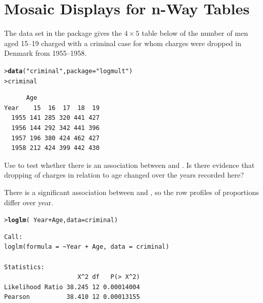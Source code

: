\documentclass[10pt]{report}\usepackage[]{graphicx}\usepackage[]{color}
\makeatletter
\newcommand{\hlstr}[1]{\textcolor[rgb]{0.192,0.494,0.8}{#1}}%
\newcommand{\hlopt}[1]{\textcolor[rgb]{0,0,0}{#1}}%
\newcommand{\hlstd}[1]{\textcolor[rgb]{0.345,0.345,0.345}{#1}}%
\newcommand{\hlkwc}[1]{\textcolor[rgb]{0.333,0.667,0.333}{#1}}%
\newcommand{\hlkwd}[1]{\textcolor[rgb]{0.737,0.353,0.396}{\textbf{#1}}}%
\newenvironment{kframe}{%
 \def\at@end@of@kframe{}%
 \ifinner\ifhmode%
  \def\at@end@of@kframe{\end{minipage}}%
  \begin{minipage}{\columnwidth}%
 \fi\fi%
 \def\FrameCommand##1{\hskip\@totalleftmargin \hskip-\fboxsep
 \colorbox{shadecolor}{##1}\hskip-\fboxsep
     \hskip-\linewidth \hskip-\@totalleftmargin \hskip\columnwidth}%
 \MakeFramed {\advance\hsize-\width
   \@totalleftmargin\z@ \linewidth\hsize
   \@setminipage}}%
 {\par\unskip\endMakeFramed%
 \at@end@of@kframe}
\newenvironment{knitrout}{}{} %
\renewenvironment{knitrout}{\small\renewcommand{\baselinestretch}{.85}}{} %
\makeatother
\begin{document}
\clearpage
\chapter[Mosaic Displays for n-Way Tables]{Mosaic Displays for n-Way \mbox{Tables}}\label{ch:mosaic}


\begin{Exercises}

\exercise\label{lab:mosaic-criminal} The data set  in the package  gives the
$4 \times 5$ table below of the
number of men aged 15--19 charged with a criminal case for whom charges were dropped
in Denmark from 1955--1958.
\begin{knitrout}\footnotesize
{}\color{fgcolor}\begin{kframe}
\begin{alltt}
\hlstd{> }\hlkwd{data}\hlstd{(}\hlstr{"criminal"}\hlstd{,} \hlkwc{package} \hlstd{=} \hlstr{"logmult"}\hlstd{)}
\hlstd{> }\hlstd{criminal}
\end{alltt}
\begin{verbatim}
      Age
Year    15  16  17  18  19
  1955 141 285 320 441 427
  1956 144 292 342 441 396
  1957 196 380 424 462 427
  1958 212 424 399 442 430
\end{verbatim}
\end{kframe}
\end{knitrout}
  \begin{enumerate*}
    \item Use  to test whether there is an association between 
    and .  Is there evidence that dropping of charges in relation to
    age changed over the years recorded here?
    \begin{ans}
    There is a significant association between  and , so
    the row profiles of proportions differ over year.
\begin{knitrout}\footnotesize
{}\color{fgcolor}\begin{kframe}
\begin{alltt}
\hlstd{> }\hlkwd{loglm}\hlstd{(}\hlopt{~}\hlstd{Year} \hlopt{+} \hlstd{Age,} \hlkwc{data}\hlstd{=criminal)}
\end{alltt}
\begin{verbatim}
Call:
loglm(formula = ~Year + Age, data = criminal)

Statistics:
                    X^2 df   P(> X^2)
Likelihood Ratio 38.245 12 0.00014004
Pearson          38.410 12 0.00013155
\end{verbatim}
\end{kframe}
\end{knitrout}


\end{ans}
\end{enumerate*}
\end{Exercises}
\end{document}
